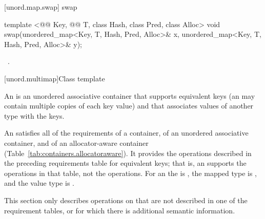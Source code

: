 \documentclass[american,twoside]{book}
\begin{document}
[unord.map.swap]{ swap}

%
%
\begin{itemdecl}
template <@@ Key, @@ T, class Hash, class Pred, class Alloc>
  void swap(unordered_map<Key, T, Hash, Pred, Alloc>& x,
            unordered_map<Key, T, Hash, Pred, Alloc>& y);
\end{itemdecl}

\begin{itemdescr}
\pnum\effects\ .
\end{itemdescr}

[unord.multimap]{Class template }
%

\pnum
{}%
%
An  is an unordered associative container
that supports equivalent keys (an  may contain
multiple copies of each key value) and that associates values of
another type  with the keys.

\pnum
An  satisfies all of the requirements of a container, of an unordered associative container, and of an allocator-aware container (Table~\ref{tab:containers.allocatoraware}). It provides the operations described in the preceding requirements table for equivalent keys; that is, an  supports the  operations in that table, not the  operations. For an  the  is , the mapped type is , and the value type is .

\pnum
This section only describes operations on 
that are not described in one of the requirement tables, or for which
there is additional semantic information.
\end{document}
